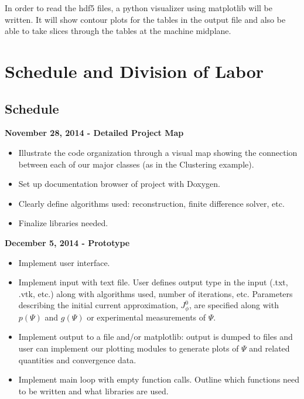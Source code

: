\documentclass[paper=a4, fontsize=11pt]{scrartcl} %
\begin{document}
In order to read the hdf5 files, a python visualizer using matplotlib will be written. It will show contour plots for the tables in the output file and also be able to take slices through the tables at the machine midplane.


\section{Schedule and Division of Labor}

\subsection{Schedule}

\textbf{November 28, 2014 - Detailed Project Map}
\begin{itemize}
\item Illustrate the code organization through a visual map showing the connection between each of our major classes (as in the Clustering example). 
\item Set up documentation browser of project with Doxygen.
\item Clearly define algorithms used: reconstruction, finite difference solver, etc.
\item Finalize libraries needed.
\end{itemize}

\textbf{December 5, 2014 - Prototype}
\begin{itemize}
\item Implement user interface. 
\item Implement input with text file. User defines output type in the input (.txt, .vtk, etc.) along with algorithms used, number of iterations, etc. Parameters describing the initial current approximation, $J^0_{\phi}$, are specified along with $p(\Psi)$ and $g(\Psi)$ or experimental measurements of $\Psi$. 
\item Implement output to a file and/or matplotlib: output is dumped to files and user can implement our plotting modules to generate plots of $\Psi$ and related quantities and convergence data. 
\item Implement main loop with empty function calls. Outline which functions need to be written and what libraries are used. 
\end{itemize}
\end{document}
